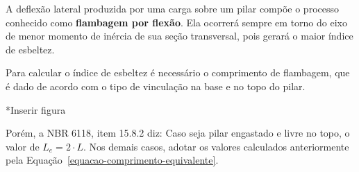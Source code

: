 A deflexão lateral produzida por uma carga sobre um pilar compõe o processo conhecido como \textbf{flambagem por flexão}. Ela ocorrerá sempre em torno do eixo de menor momento de inércia de sua seção transversal, pois gerará o maior índice de esbeltez.

Para calcular o índice de esbeltez é necessário o comprimento de flambagem, que é dado de acordo com o tipo de vinculação na base e no topo do pilar.

*Inserir figura

Porém, a NBR 6118, item 15.8.2 diz: Caso seja pilar engastado e livre no topo, o valor de $L_e=2\cdot L$. Nos demais casos, adotar os valores calculados anteriormente pela Equação~\eqref{equacao-comprimento-equivalente}.
